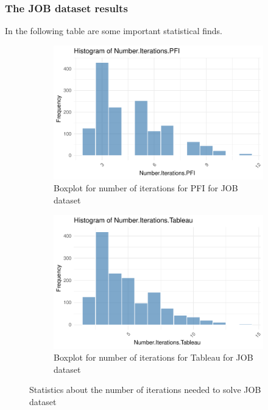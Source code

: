 \subsubsection{The JOB dataset results}
In the following table are some important statistical finds.
\begin{figure}[h]
    \centering
    \begin{subfigure}{0.45\textwidth}
        \centering
        \includegraphics[width=\linewidth]{figures/histo_iter_pfi.pdf}
        \caption{Boxplot for number of iterations for PFI for JOB dataset}
        \label{fig:num_iter_boxplot_pfi_job}
    \end{subfigure}\hfill
    \begin{subfigure}{0.45\textwidth}
        \centering
        \includegraphics[width=\linewidth]{figures/histogram_iter_tableau.pdf}
        \caption{Boxplot for number of iterations for Tableau for JOB dataset}
        \label{fig:num_iter_boxplot_tableau_job}
    \end{subfigure}
    \caption{Statistics about the number of iterations needed to solve JOB dataset}
    \label{fig:both_figures}
\end{figure}

